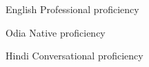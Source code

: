 
\begin{cvskills}

 	\cvskill
    {English} %
    {Professional proficiency} %

 	\cvskill
    {Odia} %
    {Native proficiency} %
    
	\cvskill
	 {Hindi} %
	 {Conversational proficiency} %
	    
\end{cvskills}
